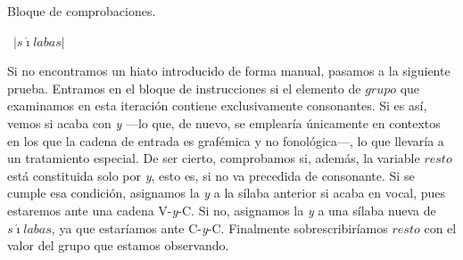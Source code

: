 \begin{algorithm}[!ht] %
	\caption{Bloque de comprobaciones.}\label{list:unefonemascomprobaciones}
	\valor \gets\ $\lvert s\acute{\imath}labas\rvert$\;
\end{algorithm}

Si no encontramos un hiato introducido de forma manual, pasamos a la siguiente prueba. Entramos en el bloque de instrucciones si el elemento de $grupo$ que examinamos en esta iteración contiene exclusivamente consonantes. Si es así, vemos si acaba con \textit{y} —lo que, de nuevo, se emplearía únicamente en contextos en los que la cadena de entrada es grafémica y no fonológica—, lo que llevaría a un tratamiento especial. De ser cierto, comprobamos si, además, la variable $resto$ está constituida solo por \textit{y}, esto es, si no va precedida de consonante. Si se cumple esa condición, asignamos la \textit{y} a la sílaba anterior si acaba en vocal, pues estaremos ante una cadena \textsc{V}-\textit{y}-\textsc{C}. Si no, asignamos la \textit{y} a una sílaba nueva de $s\acute{\imath}labas$, ya que estaríamos ante \textsc{C}-\textit{y}-\textsc{C}. Finalmente sobrescribiríamos $resto$ con el valor del grupo que estamos observando.

